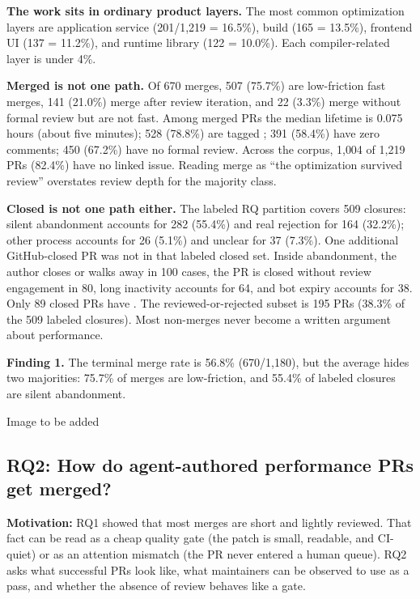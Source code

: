 \textbf{The work sits in ordinary product layers.} The most common optimization layers are application service (201/1{,}219 = 16.5\%), build (165 = 13.5\%), frontend UI (137 = 11.2\%), and runtime library (122 = 10.0\%). Each compiler-related layer is under 4\%.

\textbf{Merged is not one path.} Of 670 merges, 507 (75.7\%) are low-friction fast merges, 141 (21.0\%) merge after review iteration, and 22 (3.3\%) merge without formal review but are not fast. Among merged PRs the median lifetime is 0.075 hours (about five minutes); 528 (78.8\%) are tagged ; 391 (58.4\%) have zero comments; 450 (67.2\%) have no formal review. Across the corpus, 1{,}004 of 1{,}219 PRs (82.4\%) have no linked issue. Reading merge as “the optimization survived review” overstates review depth for the majority class.

\textbf{Closed is not one path either.} The labeled RQ partition covers 509 closures: silent abandonment accounts for 282 (55.4\%) and real rejection for 164 (32.2\%); other process accounts for 26 (5.1\%) and unclear for 37 (7.3\%). One additional GitHub-closed PR was not in that labeled closed set. Inside abandonment, the author closes or walks away in 100 cases, the PR is closed without review engagement in 80, long inactivity accounts for 64, and bot expiry accounts for 38. Only 89 closed PRs have . The reviewed-or-rejected subset is 195 PRs (38.3\% of the 509 labeled closures). Most non-merges never become a written argument about performance.

\begin{center}
\begin{tcolorbox}
\textbf{Finding 1.} The terminal merge rate is 56.8\% (670/1{,}180), but the average hides two majorities: 75.7\% of merges are low-friction, and 55.4\% of labeled closures are silent abandonment.
\end{tcolorbox}
\end{center}

{\color{red}Image to be added}

\subsection{RQ2: How do agent-authored performance PRs get merged?}
\label{RQ2}

\noindent\textbf{Motivation:} RQ1 showed that most merges are short and lightly reviewed. That fact can be read as a cheap quality gate (the patch is small, readable, and CI-quiet) or as an attention mismatch (the PR never entered a human queue). RQ2 asks what successful PRs look like, what maintainers can be observed to use as a pass, and whether the absence of review behaves like a gate.

